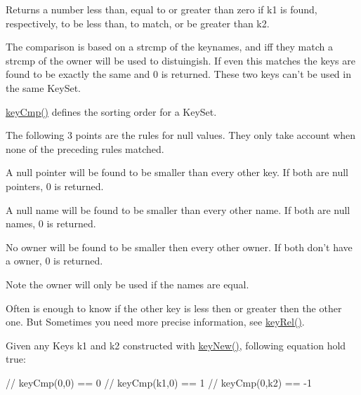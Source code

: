 \begin{DoxyReturn}{Returns}
a number less than, equal to or greater than zero if k1 is found, respectively, to be less than, to match, or be greater than k2.
\end{DoxyReturn}
The comparison is based on a strcmp of the keynames, and iff they match a strcmp of the owner will be used to distuingish. If even this matches the keys are found to be exactly the same and 0 is returned. These two keys can't be used in the same KeySet.

\hyperlink{group__keytest_gaf6e66e12fe04d535a5d1c8218ced803e}{keyCmp()} defines the sorting order for a KeySet.

The following 3 points are the rules for null values. They only take account when none of the preceding rules matched.


\begin{DoxyItemize}
\item A null pointer will be found to be smaller than every other key. If both are null pointers, 0 is returned.
\end{DoxyItemize}


\begin{DoxyItemize}
\item A null name will be found to be smaller than every other name. If both are null names, 0 is returned.
\end{DoxyItemize}


\begin{DoxyItemize}
\item No owner will be found to be smaller then every other owner. If both don't have a owner, 0 is returned.
\end{DoxyItemize}

\begin{DoxyNote}{Note}
the owner will only be used if the names are equal.
\end{DoxyNote}
Often is enough to know if the other key is less then or greater then the other one. But Sometimes you need more precise information, see \hyperlink{group__keytest_ga6bb0f95ac34ce9c42d61bb35a76139d0}{keyRel()}.

Given any Keys k1 and k2 constructed with \hyperlink{group__key_gaf6893c038b3ebee90c73a9ea8356bebf}{keyNew()}, following equation hold true:


\begin{DoxyCode}
// keyCmp(0,0) == 0
// keyCmp(k1,0) ==  1
// keyCmp(0,k2) == -1
\end{DoxyCode}


